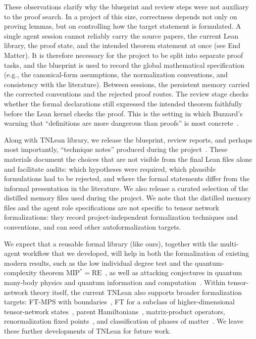 \documentclass[aps,prl,twocolumn,superscriptaddress,longbibliography,10pt,footinbib]{revtex4-2}
\begin{document}
These observations clarify why the blueprint and review steps were not auxiliary to the proof search. In a project of this size, correctness depends not only on proving lemmas, but on controlling how the target statement is formulated. A single agent session cannot reliably carry the source papers, the current Lean library, the proof state, and the intended theorem statement at once (see End Matter). It is therefore necessary for the project to be split into separate proof tasks, and the blueprint is used to record the global mathematical specification (e.g., the canonical-form assumptions, the normalization conventions, and consistency with the literature). Between sessions, the persistent memory carried the corrected conventions and the rejected proof routes. The review stage checks whether the formal declarations still expressed the intended theorem faithfully before the Lean kernel checks the proof. This is the setting in which Buzzard's warning that ``definitions are more dangerous than proofs'' is most concrete~\cite{Buzzard2025Formal}.

Along with TNLean library, we release the blueprint, review reports, and perhaps most importantly, ``technique notes'' produced during the project~\cite{TNLean,TNLeanBlueprint}. These materials document the choices that are not visible from the final Lean files alone and facilitate audits: which hypotheses were required, which plausible formulations had to be rejected, and where the formal statements differ from the informal presentation in the literature. We also release a curated selection of the distilled memory files used during the project. We note that the distilled memory files and the agent role specifications are not specific to tensor network formalizations: they record project-independent formalization techniques and conventions, and can seed other autoformalization targets.

We expect that a reusable formal library (like ours), together with the multi-agent workflow that we developed, will help in both the formalization of existing modern results, such as the low individual degree test and the quantum-complexity theorem $\mathrm{MIP}^*=\mathrm{RE}$~\cite{Ji2020LowIndividualDegree,LDTLeanPaper,Ji2021Mip}, as well as attacking conjectures in quantum many-body physics and quantum information and computation~\cite{Meiburg2024LeanQuantumInfo,Meiburg2025Formalization,Ren2026MerLean,Li2026MerLeanprover,Ehatamm2026Endtoend}. Within tensor-network theory itself, the current TNLean also supports broader formalization targets: FT-MPS with boundaries~\cite{Florido-Llinas2025Uniform}, FT for a subclass of higher-dimensional tensor-network states~\cite{Molnar2018Normal}, parent Hamiltonians~\cite{Garre-Rubio2025MPS,Schuch2025Simple}, matrix-product operators, renormalization fixed points~\cite{Cirac2017Matrixa}, and classification of phases of matter~\cite{Chen2011Classification,Schuch2011Classifying,Pollmann2012Symmetry,Chen2012Symmetryprotected}. We leave these further developments of TNLean for future work.\\
\end{document}
